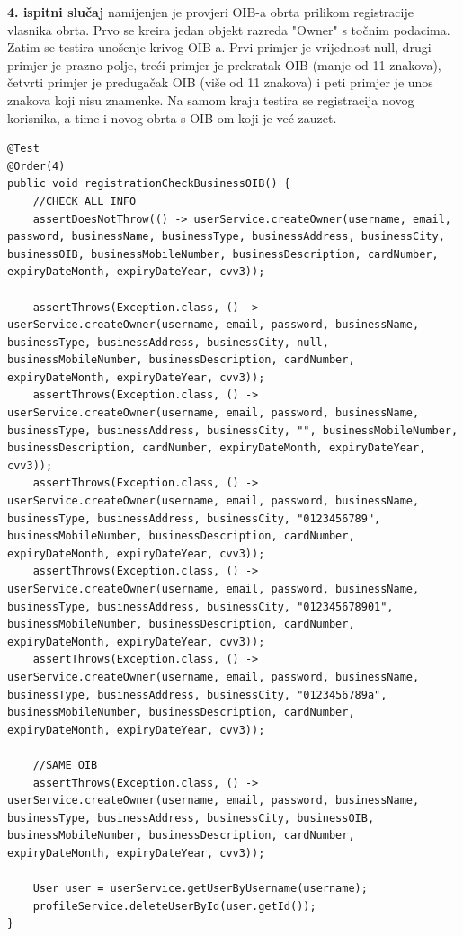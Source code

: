         \textbf{4. ispitni slučaj}{ namijenjen je provjeri OIB-a obrta prilikom registracije vlasnika obrta. Prvo se kreira jedan objekt razreda "Owner" s točnim podacima. Zatim se testira unošenje krivog OIB-a. Prvi primjer je vrijednost null, drugi primjer je prazno polje, treći primjer je prekratak OIB (manje od 11 znakova), četvrti primjer je predugačak OIB (više od 11 znakova) i peti primjer je unos znakova koji nisu znamenke. Na samom kraju testira se registracija novog korisnika, a time i novog obrta s OIB-om koji je već zauzet.}
           \begin{lstlisting}
@Test
@Order(4)
public void registrationCheckBusinessOIB() {
    //CHECK ALL INFO
    assertDoesNotThrow(() -> userService.createOwner(username, email, password, businessName, businessType, businessAddress, businessCity, businessOIB, businessMobileNumber, businessDescription, cardNumber, expiryDateMonth, expiryDateYear, cvv3));

    assertThrows(Exception.class, () -> userService.createOwner(username, email, password, businessName, businessType, businessAddress, businessCity, null, businessMobileNumber, businessDescription, cardNumber, expiryDateMonth, expiryDateYear, cvv3));
    assertThrows(Exception.class, () -> userService.createOwner(username, email, password, businessName, businessType, businessAddress, businessCity, "", businessMobileNumber, businessDescription, cardNumber, expiryDateMonth, expiryDateYear, cvv3));
    assertThrows(Exception.class, () -> userService.createOwner(username, email, password, businessName, businessType, businessAddress, businessCity, "0123456789", businessMobileNumber, businessDescription, cardNumber, expiryDateMonth, expiryDateYear, cvv3));
    assertThrows(Exception.class, () -> userService.createOwner(username, email, password, businessName, businessType, businessAddress, businessCity, "012345678901", businessMobileNumber, businessDescription, cardNumber, expiryDateMonth, expiryDateYear, cvv3));
    assertThrows(Exception.class, () -> userService.createOwner(username, email, password, businessName, businessType, businessAddress, businessCity, "0123456789a", businessMobileNumber, businessDescription, cardNumber, expiryDateMonth, expiryDateYear, cvv3));

    //SAME OIB
    assertThrows(Exception.class, () -> userService.createOwner(username, email, password, businessName, businessType, businessAddress, businessCity, businessOIB, businessMobileNumber, businessDescription, cardNumber, expiryDateMonth, expiryDateYear, cvv3));

    User user = userService.getUserByUsername(username);
    profileService.deleteUserById(user.getId());
}
        \end{lstlisting}

